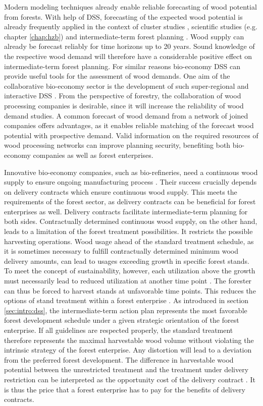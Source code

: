 Modern modeling techniques already enable reliable forecasting of wood potential from forests. With help of DSS, forecasting of the expected wood potential is already frequently applied in the context of cluster studies \citep[e.g.][]{bmel_2016}, scientific studies (e.g. chapter \ref{chap:hzb}) and intermediate-term forest planning \citep[e.g.][]{bockmann_2004}. Wood supply can already be forecast reliably for time horizons up to 20 years. Sound knowledge of the respective wood demand will therefore have a considerable positive effect on intermediate-term forest planning. For similar reasons bio-economy DSS can provide useful tools for the assessment of wood demands. One aim of the collaborative bio-economy sector is the development of such super-regional and interactive DSS \citep[p. 362]{ollikainen_2014}. From the perspective of forestry, the collaboration of wood processing companies is desirable, since it will increase the reliability of wood demand studies. A common forecast of wood demand from a network of joined companies offers advantages, as it enables reliable matching of the forecast wood potential with prospective demand. Valid information on the required resources of wood processing networks can improve planning security, benefiting both bio-economy companies as well as forest enterprises.

Innovative bio-economy companies, such as bio-refineries, need a continuous wood supply to ensure ongoing manufacturing process \citep[p. 362]{ollikainen_2014}. Their success crucially depends on delivery contracts which ensure continuous wood supply. This meets the requirements of the forest sector, as delivery contracts can be beneficial for forest enterprises as well. Delivery contracts facilitate intermediate-term planning for both sides. Contractually determined continuous wood supply, on the other hand, leads to a limitation of the forest treatment possibilities. It restricts the possible harvesting operations. Wood usage ahead of the standard treatment schedule, as it is sometimes necessary to fulfill contractually determined minimum wood delivery amounts, can lead to usages exceeding growth in specific forest stands. To meet the concept of sustainability, however, each utilization above the growth must necessarily lead to reduced utilization at another time point \citep[p. 67]{mohring_1997}. The forester can thus be forced to harvest stands at unfavorable time points. This reduces the options of stand treatment within a forest enterprise \citep[p. 351-352]{mohring_2010}. As introduced in section \ref{sec:intro:dss}, the intermediate-term action plan represents the most favorable forest development schedule under a given strategic orientation of the forest enterprise. If all guidelines are respected properly, the standard treatment therefore represents the maximal harvestable wood volume without violating the intrinsic strategy of the forest enterprise. Any distortion will lead to a deviation from the preferred forest development. The difference in harvestable wood potential between the unrestricted treatment and the treatment under delivery restriction can be interpreted as the opportunity cost of the delivery contract \citep[p. 353]{mohring_2010}. It is thus the price that a forest enterprise has to pay for the benefits of delivery contracts.

